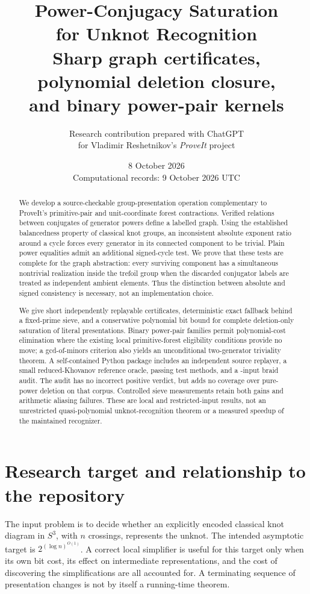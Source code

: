 \documentclass[11pt]{article}
\title{\color{ink}Power-Conjugacy Saturation\\for Unknot Recognition\\[5pt]\large Sharp graph certificates, polynomial deletion closure,\\and binary power-pair kernels}
\author{Research contribution prepared with ChatGPT\\for Vladimir Reshetnikov's \textit{ProveIt} project}
\date{8 October 2026\\\small Computational records: 9 October 2026 UTC}
\theoremstyle{definition}\newtheorem{definition}[theorem]{Definition}
\theoremstyle{remark}\newtheorem{remark}[theorem]{Remark}
\begin{document}
\maketitle
\begin{abstract}
We develop a source-checkable group-presentation operation complementary to
ProveIt's primitive-pair and unit-coordinate forest contractions. Verified
relations between conjugates of generator powers define a labelled graph.
Using the established balancedness property of classical knot groups, an
inconsistent absolute exponent ratio around a cycle forces every generator
in its connected component to be trivial. Plain power equalities admit an
additional signed-cycle test. We prove that these tests are complete for the
graph abstraction: every surviving component has a simultaneous nontrivial
realization inside the trefoil group when the discarded conjugator labels
are treated as independent ambient elements. Thus the distinction between
absolute and signed consistency is necessary, not an implementation choice.

We give short independently replayable certificates, deterministic exact
fallback behind a fixed-prime sieve, and a conservative polynomial bit bound
for complete deletion-only saturation of literal presentations. Binary
power-pair families permit polynomial-cost elimination where the existing
local primitive-forest eligibility conditions provide no move; a gcd-of-minors
criterion also yields an unconditional two-generator triviality theorem.
A self-contained Python package includes an independent source replayer,
a small reduced-Khovanov reference oracle, \TestCount{} passing test methods,
and a \AuditCount{}-input braid audit. The audit has no incorrect positive
verdict, but adds no coverage over pure-power deletion on that corpus.
Controlled sieve measurements retain both gains and arithmetic aliasing
failures. These are local and restricted-input results, not an unrestricted
quasi-polynomial unknot-recognition theorem or a measured speedup of the
maintained recognizer.
\end{abstract}
\clearpage
\begingroup\small\setlength{\parskip}{0pt}
\tableofcontents
\endgroup
\newpage

\section{Research target and relationship to the repository}
\label{sec:target}
The input problem is to decide whether an explicitly encoded classical knot
diagram in $S^3$, with $n$ crossings, represents the unknot. The intended
asymptotic target is $2^{(\log n)^{O(1)}}$. A correct local simplifier is useful
for this target only when its own bit cost, its effect on intermediate
representations, and the cost of discovering the simplifications are all
accounted for. A terminating sequence of presentation changes is not by
itself a running-time theorem.
\end{document}
